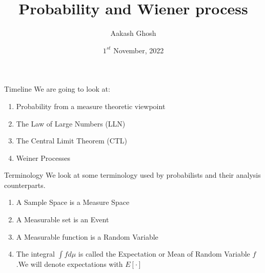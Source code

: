 \documentclass{beamer}
\title{Probability and Wiener process}
\subtitle{}
\author{Aakash Ghosh}
\institute{19MS129}
\date{$1^{st}$ November, 2022}
\begin{document}
\begin{frame}[plain]
\maketitle
\end{frame}

\begin{frame}{Timeline}    
    We are going to look at:
    \begin{enumerate}
        \item Probability from a measure theoretic viewpoint\pause
        \item The Law of Large Numbers (LLN)\pause
        \item The Central Limit Theorem (CTL)\pause
        \item Weiner Processes
    \end{enumerate}
\end{frame}




\begin{frame}{Terminology}
    We look at some terminology used by probabilists  and their analysis counterparts.\pause
    \begin{enumerate}
         \item A \textcolor{colorgreen}{Sample Space} is a \textcolor{colorblue}{Measure Space}\pause
         \item A \textcolor{colorgreen}{Measurable set} is an \textcolor{colorblue}{Event}\pause
         \item A \textcolor{colorgreen}{Measurable function} is a \textcolor{colorblue}{Random Variable}\pause
         \item The \textcolor{colorgreen}{integral $\int fd\mu$} is called the \textcolor{colorblue}{Expectation or Mean of Random Variable $f$}.\pause We will denote expectations with \textcolor{colororange}{$E[\cdot]$}
    \end{enumerate}
\end{frame}
\end{document}
